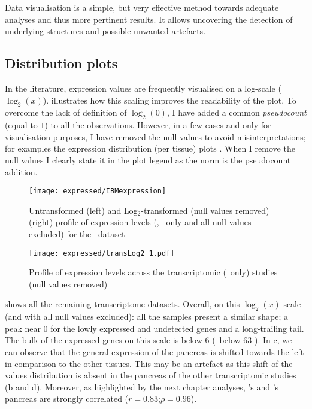 Data visualisation is a simple, but very effective method
towards adequate analyses and thus more pertinent results.
It allows uncovering the detection of underlying structures
and possible unwanted artefacts.

\subsection{Distribution plots}\label{subsec:distribPlot}
\vspace{-0.2in}
In the literature, expression values are frequently
visualised on a log-scale ($\log_{2}(x)$).
 illustrates how
this scaling improves the readability of the plot.
To overcome the lack of definition of $\log_{2}(0)$,
I have added a common \emph{pseudocount} (equal to $1$)
to all the observations.
However, in a few cases and only for visualisation purposes,
I have removed the null values to avoid misinterpretations;
for examples the expression distribution (per tissue) plots
.
When I remove the null values I clearly state it in the plot legend
as the norm is the pseudocount addition.

\begin{figure}[!htbp]
    \centering
    \texttt{[image: expressed/IBMexpression]}
    \caption{Untransformed (left) and Log$_{2}$-transformed (null values removed)
    (right) profile of expression levels (\FPKM, \pcgs\ only and all null values excluded)
    for the \ibm\ dataset}\label{fig:distribPlot}
\end{figure}

\begin{figure}[!htbp]
    \centering
    \texttt{[image: expressed/transLog2\_1.pdf]}
    \caption{Profile of expression levels across the transcriptomic (\pcgs\ only)
    studies (null values removed)
    }\label{fig:distribTrans}
\end{figure}

 shows all the remaining transcriptome datasets.
Overall,
on this $\log_{2}(x)$ scale (and with all null values excluded):
all the samples present a similar shape;
a peak near $0$ for the lowly expressed and undetected genes and a long-trailing tail.
The bulk of the expressed genes on this scale is below $6$ (\ie\ below 63 \FPKM).
In c, we can observe that the general expression
of the pancreas is shifted towards the left in comparison to the other tissues.
This may be an artefact as this shift of the values distribution
is absent in the pancreas of the other transcriptomic studies
(b and d).
Moreover, as highlighted by the next chapter analyses,
\uhlen's and  \gtex's pancreas are strongly
correlated ($r = 0.83$;$\rho = 0.96$).

